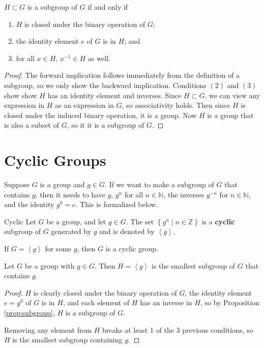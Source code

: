 \documentclass[10pt]{report}
\begin{document}
\begin{prop}
	\label{prop:subgroup}
	$H \subset G$ is a subgroup of $G$ if and only if
	\begin{enumerate}
		\item $H$ is closed under the binary operation of $G$;
		\item the identity element $e$ of $G$ is in $H$; and
		\item for all $x \in H$, $x^{-1} \in H$ as well.
	\end{enumerate}
\end{prop}
\begin{proof}
	The forward implication follows immediately from the definition of a subgroup, so we only show the backward implication. Conditions $(2)$ and $(3)$ show show $H$ has an identity element and inverses. Since $H \subset G$, we can view any expression in $H$ as an expression in $G$, so associativity holds. Then since $H$ is closed under the induced binary operation, it is a group. Now $H$ is a group that is also a subset of $G$, so it it is a subgroup of $G$.
\end{proof}


\section{Cyclic Groups}

Suppose $G$ is a group and $g \in G$. If we want to make a subgroup of $G$ that contains $g$, then it needs to have $g$, $g^n$ for all $n \in \mathbb{N}$, the inverses $g^{-n}$ for $n \in \mathbb{N}$, and the identity $g^0 = e$. This is formalized below.

\begin{defn}{Cyclic}{}
	Let $G$ be a group, and let $g \in G$. The set $\left\{ g^n \;|\; n \in \mathbb{Z} \right\}$ is a \textbf{cyclic} subgroup of $G$ generated by $g$ and is denoted by $\left\langle g \right\rangle$.

	If $G = \left\langle g \right\rangle$ for some $g$, then $G$ is a cyclic group.
\end{defn}

\begin{thrm}{}{}
Let $G$ be a group with $g \in G$. Then $H=\left\langle g \right\rangle$ is the smallest subgroup of $G$ that contains $g$.
\end{thrm}
\begin{proof}
	$H$ is clearly closed under the binary operation of $G$, the identity element $e=g^0$ of $G$ is in $H$, and each element of $H$ has an inverse in $H$, so by Proposition \ref{prop:subgroup}, $H$ is a subgroup of $G$.

	Removing any element from $H$ breaks at least 1 of the 3 previous conditions, so $H$ is the smallest subgroup containing $g$.
\end{proof}
\end{document}
